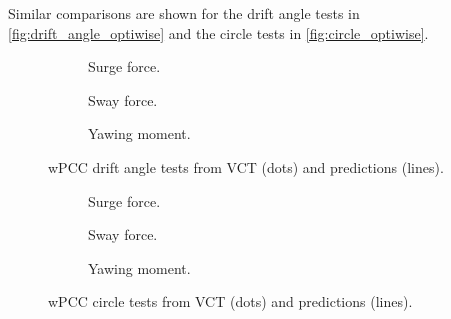 Similar comparisons are shown for the drift angle tests in \autoref{fig:drift_angle_optiwise} and the circle tests in \autoref{fig:circle_optiwise}. 
\begin{figure}[h]
     \centering
     \begin{subfigure}[b]{0.32\textwidth}
         \centering
         
        \caption{Surge force.}
        \label{fig:drift_angle_X_wPCC}
     \end{subfigure}
     \hfill
     \begin{subfigure}[b]{0.32\textwidth}
         \centering
         
        \caption{Sway force.}
        \label{fig:drift_angle_Y_wPCC}
     \end{subfigure}
     \hfill
     \begin{subfigure}[b]{0.32\textwidth}
         \centering
         
        \caption{Yawing moment.}
        \label{fig:drift_angle_N_wPCC}
     \end{subfigure}
    \caption{wPCC drift angle tests from VCT (dots) and predictions (lines).}
    \label{fig:drift_angle_wPCC}
\end{figure}
\begin{figure}[h]
     \centering
     \begin{subfigure}[b]{0.32\textwidth}
         \centering
         
        \caption{Surge force.}
        \label{fig:drift_angle_X_wPCC}
     \end{subfigure}
     \hfill
     \begin{subfigure}[b]{0.32\textwidth}
         \centering
         
        \caption{Sway force.}
        \label{fig:drift_angle_Y_wPCC}
     \end{subfigure}
     \hfill
     \begin{subfigure}[b]{0.32\textwidth}
         \centering
         
        \caption{Yawing moment.}
        \label{fig:drift_angle_N_wPCC}
     \end{subfigure}
    \caption{wPCC circle tests from VCT (dots) and predictions (lines).}
    \label{fig:circle_wPCC}
\end{figure}

